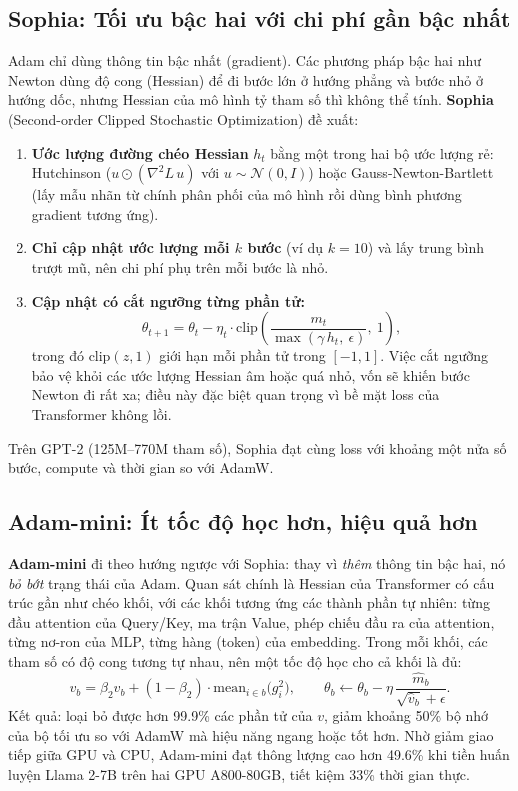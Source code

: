 \subsection{Sophia: Tối ưu bậc hai với chi phí gần bậc nhất}
\label{ssec:sophia}
Adam chỉ dùng thông tin bậc nhất (gradient). Các phương pháp bậc hai như Newton dùng độ cong (Hessian) để đi bước lớn ở hướng phẳng và bước nhỏ ở hướng dốc, nhưng Hessian của mô hình tỷ tham số thì không thể tính. \textbf{Sophia} (Second-order Clipped Stochastic Optimization) \cite{liu2024sophia} đề xuất:
\begin{enumerate}
	\item \textbf{Ước lượng đường chéo Hessian} $h_t$ bằng một trong hai bộ ước lượng rẻ: Hutchinson ($u \odot (\nabla^2 L\, u)$ với $u \sim \mathcal{N}(0, I)$) hoặc Gauss-Newton-Bartlett (lấy mẫu nhãn từ chính phân phối của mô hình rồi dùng bình phương gradient tương ứng).
	\item \textbf{Chỉ cập nhật ước lượng mỗi $k$ bước} (ví dụ $k = 10$) và lấy trung bình trượt mũ, nên chi phí phụ trên mỗi bước là nhỏ.
	\item \textbf{Cập nhật có cắt ngưỡng từng phần tử:}
	\begin{equation}
		\theta_{t+1} = \theta_t - \eta_t \cdot \text{clip}\left(\frac{m_t}{\max(\gamma\, h_t,\ \epsilon)},\ 1\right),
	\end{equation}
	trong đó $\text{clip}(z, 1)$ giới hạn mỗi phần tử trong $[-1, 1]$. Việc cắt ngưỡng bảo vệ khỏi các ước lượng Hessian âm hoặc quá nhỏ, vốn sẽ khiến bước Newton đi rất xa; điều này đặc biệt quan trọng vì bề mặt loss của Transformer không lồi.
\end{enumerate}
Trên GPT-2 (125M--770M tham số), Sophia đạt cùng loss với khoảng một nửa số bước, compute và thời gian so với AdamW.

\subsection{Adam-mini: Ít tốc độ học hơn, hiệu quả hơn}
\label{ssec:adam_mini}
\textbf{Adam-mini} \cite{zhang2025adammini} đi theo hướng ngược với Sophia: thay vì \emph{thêm} thông tin bậc hai, nó \emph{bỏ bớt} trạng thái của Adam. Quan sát chính là Hessian của Transformer có cấu trúc gần như chéo khối, với các khối tương ứng các thành phần tự nhiên: từng đầu attention của Query/Key, ma trận Value, phép chiếu đầu ra của attention, từng nơ-ron của MLP, từng hàng (token) của embedding. Trong mỗi khối, các tham số có độ cong tương tự nhau, nên một tốc độ học cho cả khối là đủ:
\[
v_b = \beta_2 v_b + (1-\beta_2)\cdot \text{mean}_{i \in b}\big(g_i^2\big), \qquad \theta_b \leftarrow \theta_b - \eta\,\frac{\hat{m}_b}{\sqrt{\hat{v}_b} + \epsilon}.
\]
Kết quả: loại bỏ được hơn 99.9\% các phần tử của $v$, giảm khoảng 50\% bộ nhớ của bộ tối ưu so với AdamW mà hiệu năng ngang hoặc tốt hơn. Nhờ giảm giao tiếp giữa GPU và CPU, Adam-mini đạt thông lượng cao hơn 49.6\% khi tiền huấn luyện Llama 2-7B trên hai GPU A800-80GB, tiết kiệm 33\% thời gian thực.

